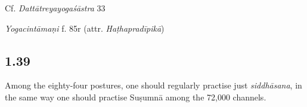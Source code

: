 \begin{ekdosis}
\begin{sources}[hp01_038]
Cf. \emph{Dattātreyayogaśāstra} 33

\begin{versinnote}
\end{versinnote}

\end{sources}

\begin{testimonia}[hp01_038]
\emph{Yogacintāmaṇi} f. 85r (attr. \emph{Haṭhapradīpikā})

\begin{versinnote}
\end{versinnote}

\end{testimonia}

\begin{philcomm}[hp01_038]

\end{philcomm}

\subsection*{1.39}
\begin{translation}[hp01_039]
Among the eighty-four postures, one should regularly practise just \emph{siddhāsana}, in the same way one should practise Suṣumnā among the 72,000 channels.
\end{translation}


\end{ekdosis}
